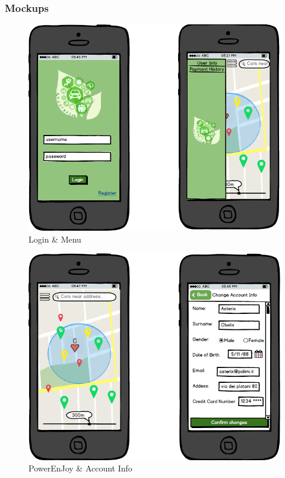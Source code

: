 \documentclass[english]{article}
\begin{document}
			\subsubsection{Mockups}
				\begin{figure}[H]
					\centering
					\includegraphics[scale=0.4]{./Mockups/powerEnjoyUser/login+menu.png}%
					\caption{Login \& Menu}
				\end{figure}
				\begin{figure}[H]
					\centering
					\includegraphics[scale=0.4]{./Mockups/powerEnjoyUser/powerEnJoy+accountInfo.png}%
					\caption{PowerEnJoy \& Account Info}
				\end{figure}
\end{document}
